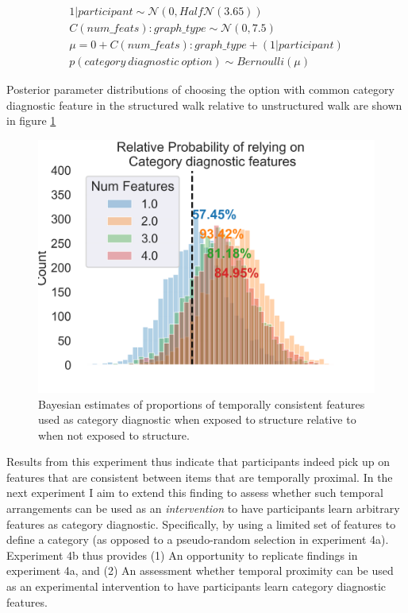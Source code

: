 \begin{equation}
    \begin{aligned}
        1|participant \sim \mathcal{N}(0, Half\mathcal{N}(3.65)) \\
        C(num\_feats):graph\_type \sim \mathcal{N}(0, 7.5) \\ 
        \mu = 0  + C(num\_feats):graph\_type + (1|participant) \\
        p(category\ diagnostic\ option) \sim Bernoulli(\mu) 
    \end{aligned}
\end{equation}

Posterior parameter distributions of choosing the option with common category diagnostic feature in the structured walk relative to unstructured walk are shown in figure \ref{fig:exp4a-bayesmodel-choice-accuracy}
\begin{figure}[h]
    \centering
    \includegraphics[width = \textwidth]{chapter_notebooks/chapter_4/figures/exp4_bayesmodel_res.png}
    \caption{Bayesian estimates of proportions of temporally consistent features used as category diagnostic when exposed to structure relative to when not exposed to structure.}
    \label{fig:exp4a-bayesmodel-choice-accuracy}
\end{figure}

Results from this experiment thus indicate that participants indeed pick up on features that are consistent between items that are temporally proximal. In the next experiment I aim to extend this finding to assess whether such temporal arrangements can be used as an \textit{intervention} to have participants learn arbitrary features as category diagnostic. Specifically, by using a limited set of features to define a category (as opposed to a pseudo-random selection in experiment 4a). Experiment 4b thus provides (1) An opportunity to replicate findings in experiment 4a, and (2) An assessment whether temporal proximity can be used as an experimental intervention to have participants learn category diagnostic features. 

